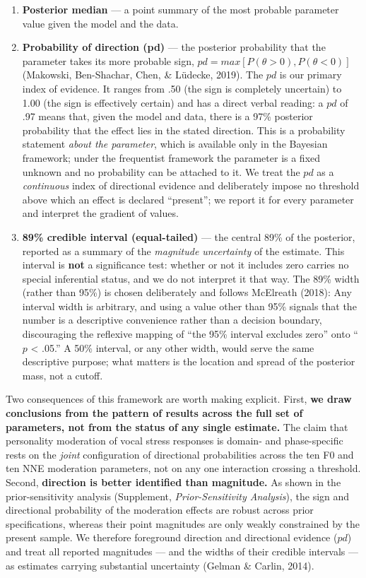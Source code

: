 \documentclass[
  english,
  man,floatsintext]{apa6}
\begin{document}
\begin{enumerate}
\def\labelenumi{\arabic{enumi}.}
\item
  \textbf{Posterior median} --- a point summary of the most probable parameter value given the
  model and the data.
\item
  \textbf{Probability of direction (pd)} --- the posterior probability that the parameter takes
  its more probable sign, \(pd = max[P(\theta > 0), P(\theta < 0)]\) (Makowski, Ben-Shachar, Chen, \& Lüdecke, 2019). The \(pd\) is our primary index of evidence. It ranges from .50 (the sign is completely uncertain) to
  1.00 (the sign is effectively certain) and has a direct verbal reading: a \(pd\) of .97
  means that, given the model and data, there is a 97\% posterior probability that the
  effect lies in the stated direction. This is a probability statement \emph{about the
  parameter}, which is available only in the Bayesian framework; under the frequentist
  framework the parameter is a fixed unknown and no probability can be attached to it. We
  treat the \(pd\) as a \emph{continuous} index of directional evidence and deliberately impose no
  threshold above which an effect is declared ``present''; we report it for every parameter
  and interpret the gradient of values.
\item
  \textbf{89\% credible interval (equal-tailed)} --- the central 89\% of the posterior, reported
  as a summary of the \emph{magnitude uncertainty} of the estimate. This interval is \textbf{not} a
  significance test: whether or not it includes zero carries no special inferential
  status, and we do not interpret it that way. The 89\% width (rather than 95\%) is chosen
  deliberately and follows McElreath (2018): Any interval width is arbitrary, and using a
  value other than 95\% signals that the number is a descriptive convenience rather than a
  decision boundary, discouraging the reflexive mapping of ``the 95\% interval excludes
  zero'' onto ``\(p\) \textless{} .05.'' A 50\% interval, or any other width, would serve the same
  descriptive purpose; what matters is the location and spread of the posterior mass, not
  a cutoff.
\end{enumerate}

Two consequences of this framework are worth making explicit. First, \textbf{we draw conclusions
from the pattern of results across the full set of parameters, not from the status of any
single estimate.} The claim that personality moderation of vocal stress responses is
domain- and phase-specific rests on the \emph{joint} configuration of directional probabilities
across the ten F0 and ten NNE moderation parameters, not on any one interaction crossing a
threshold. Second, \textbf{direction is better identified than magnitude.} As shown in the
prior-sensitivity analysis (Supplement, \emph{Prior-Sensitivity Analysis}), the sign and
directional probability of the moderation effects are robust across prior specifications,
whereas their point magnitudes are only weakly constrained by the present sample. We
therefore foreground direction and directional evidence (\(pd\)) and treat all reported
magnitudes --- and the widths of their credible intervals --- as estimates carrying
substantial uncertainty (Gelman \& Carlin, 2014).
\end{document}
